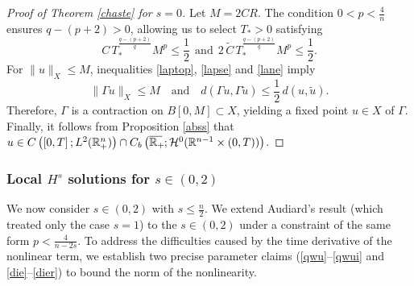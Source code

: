 \documentclass[preprint,compress,12pt]{elsarticle}
\numberwithin{equation}{section}
\begin{document}
\begin{proof}[Proof of Theorem \ref{chaste} for $s=0$]
	Let $M=2CR$.
	The condition $0<p<\frac{4}{n}$ ensures $q-(p+2)>0$, allowing us to select  $T_{*}>0$ satisfying
	\begin{equation}\label{lane}
		C\,T_{*}^{\frac{q-(p+2)}{q}}M^{p}\leq \frac{1}{2}\ \ \text{and} \ \ 2\,\widetilde{C}\,T_{*}^{\frac{q-(p+2)}{q}}M^{p}\leq \frac{1}{2}.
	\end{equation}
	For $\|u\|_{X}\leq M$, inequalities \eqref{laptop}, \eqref{lapse} and \eqref{lane} imply
	\begin{equation*}
		\|\Gamma u\|_{X}\leq M\quad \text{and} \quad d\left(\Gamma u,\Gamma \tilde{u}\right)\leq\frac{1}{2}\,d(u,\tilde{u}).
	\end{equation*}
	Therefore, $\Gamma$ is a contraction on $B[0,M]\subset X$, yielding a fixed point $u\in X$ of $\Gamma$. Finally, it follows from Proposition \ref{abss} that $u\in C\left(\left[0,T\right];L^{2}(\mathbb{R}^{n}_{+})\right)\cap C_{b}\left(\overline{\mathbb{R}_{+}\mkern-4mu}\,;\mathcal{H}^{0}(\mathbb{R}^{n-1}\times(0,T))\right)$.
\end{proof}
\subsubsection{Local $H^{s}$ solutions for $s\in(0,2)$}
We now consider $s\in(0,2)$ with $s\leq\frac{n}{2}$. We extend  Audiard's result \cite{facilitate} (which treated only the case $s=1$) to the $s\in(0,2)$ under a constraint  of the same form $p<\frac{4}{n-2s}$. To address the difficulties caused by  the time derivative of the nonlinear term, we establish two precise parameter claims  (\eqref{qwu}--\eqref{qwui} and \eqref{die}--\eqref{dier}) to bound  the norm of the nonlinearity.
\end{document}
